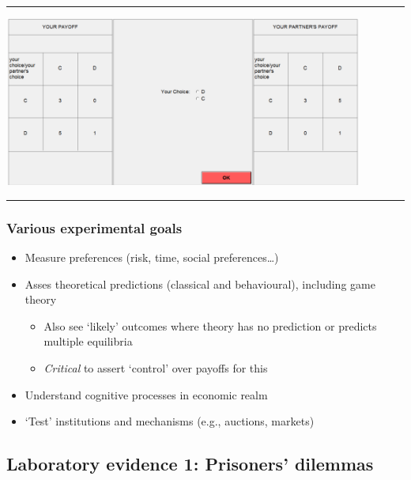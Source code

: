 \documentclass[]{article}
\providecommand{\tightlist}{%
  \setlength{\itemsep}{0pt}\setlength{\parskip}{0pt}}
\begin{document}
\begin{center}\rule{0.5\linewidth}{\linethickness}\end{center}

\includegraphics[height=2.2in]{picsfigs/ztreePD.png}

\begin{center}\rule{0.5\linewidth}{\linethickness}\end{center}

\hypertarget{various-experimental-goals}{%
\subsubsection{Various experimental goals}\label{various-experimental-goals}}

\begin{itemize}
\tightlist
\item
  Measure preferences (risk, time, social preferences\ldots{})
\item
  Asses theoretical predictions (classical and behavioural), including game theory

  \begin{itemize}
  \tightlist
  \item
    Also see `likely' outcomes where theory has no prediction or predicts multiple equilibria
  \item
    \emph{Critical} to assert `control' over payoffs for this
  \end{itemize}
\item
  Understand cognitive processes in economic realm
\item
  `Test' institutions and mechanisms (e.g., auctions, markets)
\end{itemize}

\hypertarget{laboratory-evidence-1-prisoners-dilemmas}{%
\subsection{Laboratory evidence 1: Prisoners' dilemmas}\label{laboratory-evidence-1-prisoners-dilemmas}}
\end{document}
